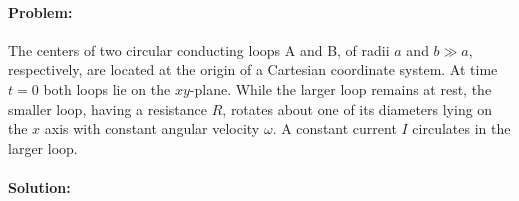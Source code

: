 \paragraph{Problem:} The centers of two circular conducting loops A and B, of radii $a$ and $b \gg a$, respectively, are located at the origin of a Cartesian coordinate system. At time $t = 0$ both loops lie on the $xy$-plane. While the larger loop remains at rest, the smaller loop, having a resistance $R$, rotates about one of its diameters lying on the $x$ axis with constant angular velocity $\omega$. A constant current $I$ circulates in the larger loop.

\paragraph{Solution:}